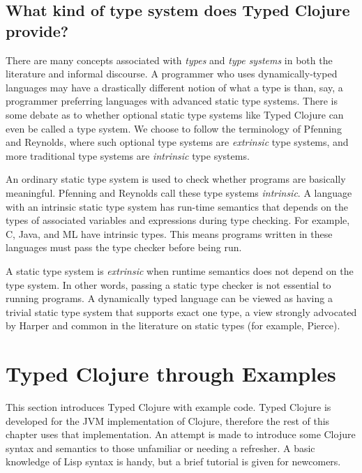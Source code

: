 \subsection{What kind of type system does Typed Clojure provide?}


There are many concepts associated with \emph{types} and \emph{type systems} in both the
literature and informal discourse.
A programmer who uses dynamically-typed languages may have a drastically different notion
of what a type is than, say, a programmer preferring languages with advanced static type systems.
There is some debate as to whether optional static type systems like Typed Clojure
can even be called a type system. We choose to
follow the terminology of Pfenning\cite{Pfe08} and Reynolds\cite{Rey01},
where such optional type systems are \emph{extrinsic} type systems, and more
traditional type systems are \emph{intrinsic} type systems.

An ordinary static type system is used to check whether programs are basically
meaningful. Pfenning and Reynolds call these type systems \emph{intrinsic}. A language with an intrinsic
static type system has run-time semantics that depends on the types of associated
variables and expressions during type checking.
For example, C, Java, and ML have intrinsic types.
This means programs written in these languages must pass the type checker before being run.

A static type system is \emph{extrinsic} when runtime semantics
does not depend on the type system. In other words, passing a static type checker
is not essential to running programs. A dynamically typed language can be viewed
as having a trivial static type system that supports exact one type,
a view strongly advocated by Harper\cite{Har12}
and common in the literature on static types (for example, Pierce\cite{Pie02}).

\section{Typed Clojure through Examples}

This section introduces Typed Clojure with example code. 
Typed Clojure is developed for the JVM implementation of Clojure, therefore
the rest of this chapter uses that implementation.
An attempt is
made to introduce some Clojure syntax and semantics to those unfamiliar or needing a refresher.
A basic knowledge of Lisp syntax is handy, but a brief tutorial is given
for newcomers.

